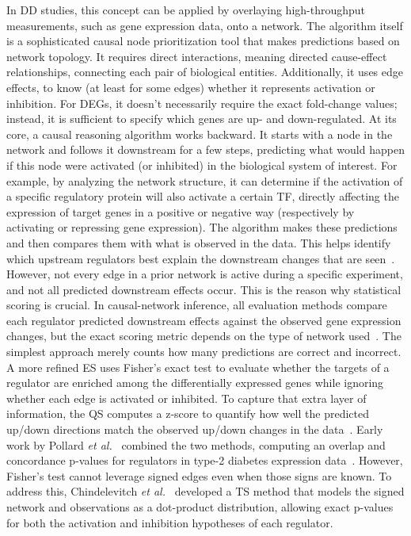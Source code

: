 In \gls{DD} studies, this concept can be applied by overlaying high-throughput measurements, such as gene expression data, onto a network. 
The algorithm itself is a sophisticated causal node prioritization tool that makes predictions based on network topology. 
It requires direct interactions, meaning directed cause-effect relationships, connecting each pair of biological entities. 
Additionally, it uses edge effects, to know (at least for some edges) whether it represents activation or inhibition. 
For \gls{DEGs}, it doesn't necessarily require the exact fold-change values; instead, it is sufficient to specify which genes are up- and down-regulated. 
At its core, a causal reasoning algorithm works backward. It starts with a node in the network and follows it downstream for a few steps, predicting what would happen if this node were activated (or inhibited) in the biological system of interest. 
For example, by analyzing the network structure, it can determine if the activation of a specific regulatory protein will also activate a certain TF, directly affecting the expression of target genes in a positive or negative way (respectively by activating or repressing gene expression). 
The algorithm makes these predictions and then compares them with what is observed in the data. 
This helps identify which upstream regulators best explain the downstream changes that are seen~\cite{RN32}. However, not every edge in a prior network is active during a specific experiment, and not all predicted downstream effects occur. 
This is the reason why statistical scoring is crucial. In causal-network inference, all evaluation methods compare each regulator predicted downstream effects against the observed gene expression changes, but the exact scoring metric depends on the type of network used~\cite{RN81}. 
The simplest approach merely counts how many predictions are correct and incorrect. A more refined \gls{ES} uses Fisher's exact test to evaluate whether the targets of a regulator are enriched among the differentially expressed genes while ignoring whether each edge is activated or inhibited. 
To capture that extra layer of information, the \gls{QS} computes a z-score to quantify how well the predicted up/down directions match the observed up/down changes in the data~\cite{RN156}. 
Early work by Pollard \textit{et al.}~\cite{RN135} combined the two methods, computing an overlap and concordance p-values for regulators in type-2 diabetes expression data~\cite{RN156}.  
However, Fisher's test cannot leverage signed edges even when those signs are known.
To address this, Chindelevitch \textit{et al.}~\cite{RN73, RN131} developed a \gls{TS} method that models the signed network and observations as a dot-product distribution, allowing exact p-values for both the activation and inhibition hypotheses of each regulator. 
